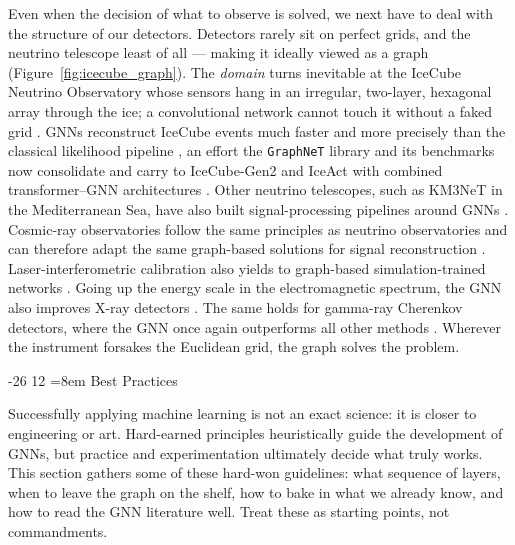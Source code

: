 \documentclass[graybox, envcountchap]{Template/svmult}
\makeatletter
\renewcommand\section{\@startsection{section}{1}{\z@}%
                       {-26\p@}%
                       {12\p@}%
                       {\normalfont\secsize\secstyle
                        \rightskip=\z@ \@plus 8em\pretolerance=10000 }}
\makeatother
\begin{document}
Even when the decision of what to observe is solved, we next have to deal with the structure of our detectors. Detectors rarely sit on perfect grids, and the neutrino telescope least of all --- making it ideally viewed as a graph (Figure~\ref{fig:icecube_graph}). The \emph{domain} turns inevitable at the IceCube Neutrino Observatory whose sensors hang in an irregular, two-layer, hexagonal array through the ice; a convolutional network cannot touch it without a faked grid \citep{Choma2018_IceCube_classification, Abbasi2022_IceCube_lowenergy}. GNNs reconstruct IceCube events much faster and more precisely than the classical likelihood pipeline \citep{Choma2018_IceCube_classification, Jespersen2021_icecube_bachelor, Abbasi2022_IceCube_lowenergy, Soldin2025_IceCube_GCN}, an effort the \texttt{GraphNeT} library and its benchmarks now consolidate \citep{Bukhari2023_icecube_kaggle, Sogaard2023_graphnet_neutrino, Orsoe2025_graphnet2_library, Orsoe2026_nubench_benchmark} and carry to IceCube-Gen2 and IceAct with combined transformer--GNN architectures \citep{Paul2025_IceAct_spectrum, VaraCarbonell2025_IceCubeGen2_ML}. Other neutrino telescopes, such as KM3NeT in the Mediterranean Sea, have also built signal-processing pipelines around GNNs \citep{Reck2021_GNN_MediterraneanNeutrinoObservatory}. Cosmic-ray observatories follow the same principles as neutrino observatories and can therefore adapt the same graph-based solutions for signal reconstruction \citep{Ferriere2025_GRAND_cosmicray, Rodriguez2025_Auger_photon, Macias2026_radio_instrumentation_SBI_GNN}. Laser-interferometric calibration also yields to graph-based simulation-trained networks \citep{Kannan2025_interferometer_GNN}. Going up the energy scale in the electromagnetic spectrum, the GNN also improves X-ray detectors \citep{Latorre2026_GNNs_Xray_detectors}. The same holds for gamma-ray Cherenkov detectors, where the GNN once again outperforms all other methods \citep{Glombitza2025_GNN_GammaRayCherenkov}. Wherever the instrument forsakes the Euclidean grid, the graph solves the problem.



\section{Best Practices}
\label{sec:bestpractices}

Successfully applying machine learning is not an exact science: it is closer to engineering or art. Hard-earned principles heuristically guide the development of GNNs, but practice and experimentation ultimately decide what truly works. This section gathers some of these hard-won guidelines: what sequence of layers, when to leave the graph on the shelf, how to bake in what we already know, and how to read the GNN literature well. Treat these as starting points, not commandments.
\end{document}
